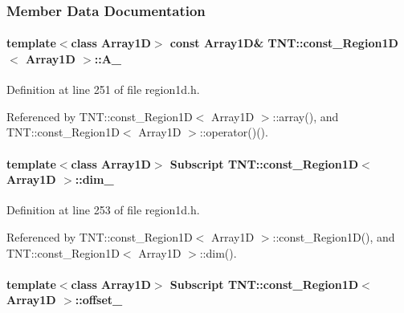 \subsubsection{Member Data Documentation}
\paragraph[{A\_\-}]{\setlength{\rightskip}{0pt plus 5cm}template$<$class Array1D$>$ const Array1D\& {\bf TNT::const\_\-Region1D}$<$ Array1D $>$::{\bf A\_\-}}\hfill\label{class_t_n_t_1_1const___region1_d_af3728b44cb958465eeb54e402d10d055}


Definition at line 251 of file region1d.h.



Referenced by TNT::const\_\-Region1D$<$ Array1D $>$::array(), and TNT::const\_\-Region1D$<$ Array1D $>$::operator()().

\paragraph[{dim\_\-}]{\setlength{\rightskip}{0pt plus 5cm}template$<$class Array1D$>$ {\bf Subscript} {\bf TNT::const\_\-Region1D}$<$ Array1D $>$::{\bf dim\_\-}}\hfill\label{class_t_n_t_1_1const___region1_d_a73309057b2d08cd38c7b014e551d2cb3}


Definition at line 253 of file region1d.h.



Referenced by TNT::const\_\-Region1D$<$ Array1D $>$::const\_\-Region1D(), and TNT::const\_\-Region1D$<$ Array1D $>$::dim().

\paragraph[{offset\_\-}]{\setlength{\rightskip}{0pt plus 5cm}template$<$class Array1D$>$ {\bf Subscript} {\bf TNT::const\_\-Region1D}$<$ Array1D $>$::{\bf offset\_\-}}\hfill\label{class_t_n_t_1_1const___region1_d_a97e89ab75245ddb0b76bef4cb1421677}


